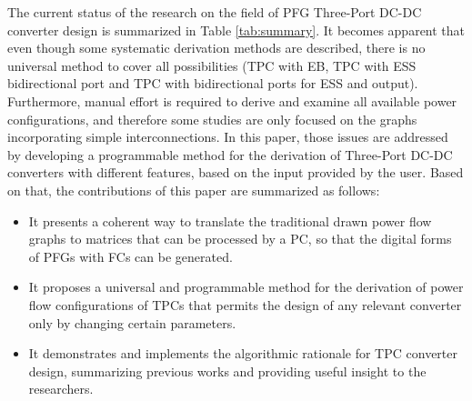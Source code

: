 \documentclass[conference]{IEEEtran}
\begin{document}
The current status of the research on the field of PFG Three-Port DC-DC converter design is summarized in Table \ref{tab:summary}. It becomes apparent that even though some systematic derivation methods are described, there is no universal method to cover all possibilities (TPC with EB, TPC with ESS bidirectional port and TPC with bidirectional ports for ESS and output). Furthermore, manual effort is required to derive and examine all available power configurations, and therefore some studies are only focused on the graphs incorporating simple interconnections. In this paper, those issues are addressed by developing a programmable method for the derivation of Three-Port DC-DC converters with different features, based on the input provided by the user. Based on that, the contributions of this paper are summarized as follows:
\begin{itemize}
    \item It presents a coherent way to translate the traditional drawn power flow graphs to matrices that can be processed by a PC, so that the digital forms of PFGs with FCs can be generated.
    \item It proposes a universal and programmable method for the derivation of power flow configurations of TPCs that permits the design of any relevant converter only by changing certain parameters.
    \item It demonstrates and implements the algorithmic rationale for TPC converter design, summarizing previous works and providing useful insight to the researchers.
\end{itemize}
\end{document}
